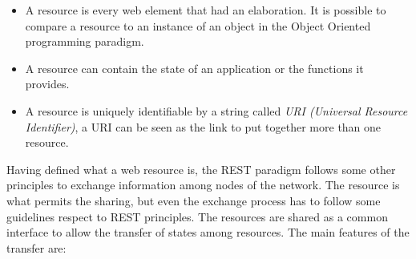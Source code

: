 \begin{itemize}
	\item A resource is every web element that had an elaboration. It is possible to compare a resource to an instance of an object in the Object Oriented programming paradigm.
	
	\item A resource can contain the state of an application or the functions it provides.
	
	\item A resource is uniquely identifiable by a string called \textit{URI (Universal Resource Identifier)}, a URI can be seen as the link to put together more than one resource.	
\end{itemize}

Having defined what a web resource is, the REST paradigm follows some other principles to exchange information among nodes of the network. The resource is what permits the sharing, but even the exchange process has to follow some guidelines respect to REST principles. The resources are shared as a common interface to allow the transfer of states among resources. The main features of the transfer are:

